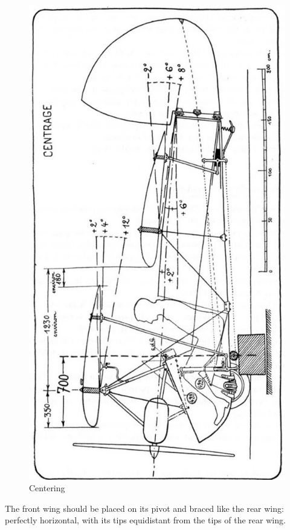 \documentclass{book}
\begin{document}
\begin{figure}
  \includegraphics[width=\linewidth]{fig-83.jpg}
  \caption{Centering}
  \label{fig:eightythree}
\end{figure}

The front wing should be placed on its pivot and braced like the rear
wing: perfectly horizontal, with its tips equidistant from the tips of
the rear wing.
\end{document}
